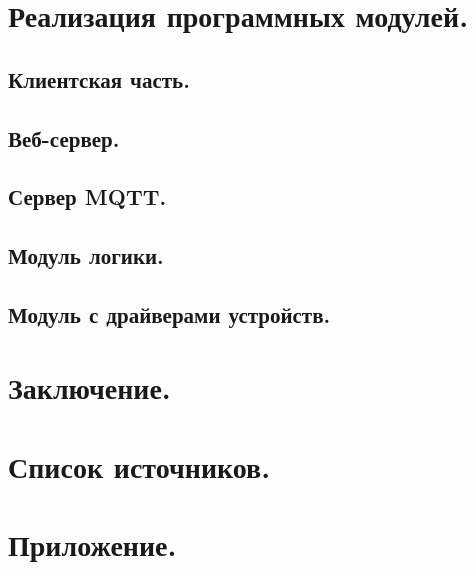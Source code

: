 \clearpage

\section{Реализация программных модулей.}

\subsection{Клиентская часть.}

\subsection{Веб-сервер.}

\subsection{Сервер MQTT.}

\subsection{Модуль логики.}

\subsection{Модуль с драйверами устройств.}

\clearpage

\section{Заключение.}

\clearpage

\section{Список источников.}

\clearpage

\section{Приложение.}
